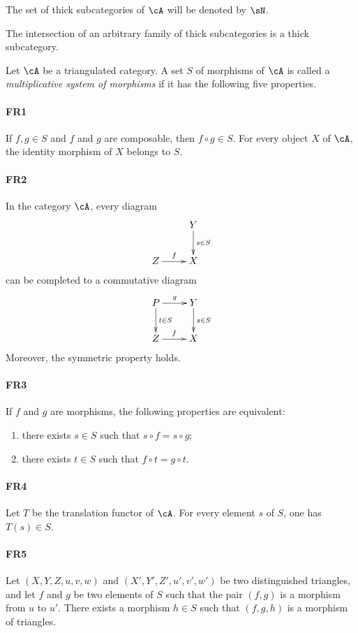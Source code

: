 The set of thick subcategories of $\cA$ will be denoted by $\sN$.

The intersection of an arbitrary family of thick subcategories is a thick
subcategory.

\begin{definition}
Let $\cA$ be a triangulated category. A set $S$ of morphisms of $\cA$ is
called a \emph{multiplicative system of morphisms} if it has the following
five properties.

\paragraph{FR1}
\hypertarget{VIII:FR1}{}
If $f,g\in S$ and $f$ and $g$ are composable, then $f\circ g\in S$. For
every object $X$ of $\cA$, the identity morphism of $X$ belongs to $S$.

\paragraph{FR2}
\hypertarget{VIII:FR2}{}
In the category $\cA$, every diagram
\[\xymatrix{
  & Y \ar[d]^-{s\in S} \\
  Z \ar[r]^-f
    & X
}\]
can be completed to a commutative diagram
\[\xymatrix{
  P \ar[r]^-g \ar[d]^-{t\in S}
    & Y \ar[d]^-{s\in S} \\
  Z \ar[r]^-f
    & X
}\]
Moreover, the symmetric property holds.

\paragraph{FR3}
\hypertarget{VIII:FR3}{}
If $f$ and $g$ are morphisms, the following properties are equivalent:
\begin{enumerate}[\indent i)]
  \item there exists $s\in S$ such that $s\circ f=s\circ g$;
  \item there exists $t\in S$ such that $f\circ t=g\circ t$.
\end{enumerate}

\paragraph{FR4}
\hypertarget{VIII:FR4}{}
Let $T$ be the translation functor of $\cA$. For every element $s$ of $S$,
one has $T(s)\in S$.

\paragraph{FR5}
\hypertarget{VIII:FR5}{}
Let $(X,Y,Z,u,v,w)$ and $(X',Y',Z',u',v',w')$ be two distinguished
triangles, and let $f$ and $g$ be two elements of $S$ such that the pair
$(f,g)$ is a morphism from $u$ to $u'$. There exists a morphism $h\in S$
such that $(f,g,h)$ is a morphism of triangles.
\end{definition}

